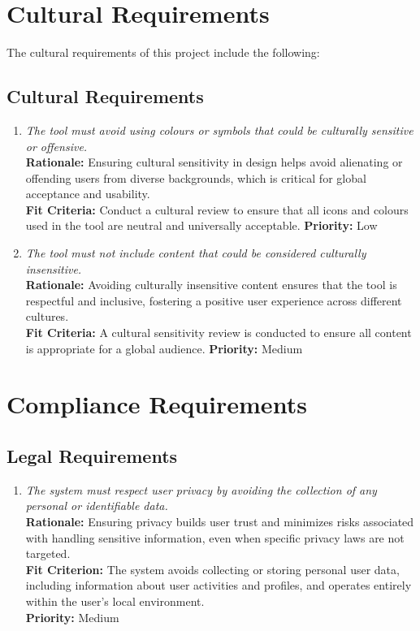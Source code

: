 \documentclass[12pt]{article}
\begin{document}
\section{Cultural Requirements}
The cultural requirements of this project include the following:
\subsection{Cultural Requirements}
\begin{enumerate}[label=CULT \arabic*., wide=0pt, leftmargin=*]
  \item \emph{The tool must avoid using colours or symbols that could
    be culturally sensitive or offensive.}\\
    {\bf Rationale:} Ensuring cultural sensitivity in design helps
    avoid alienating or offending users from diverse backgrounds,
    which is critical for global acceptance and usability.\\
    {\bf Fit Criteria:} Conduct a cultural review to ensure that all
    icons and colours used in the tool are neutral and universally acceptable.
    {\bf Priority:} Low


  \item \emph{The tool must not include content that could be
    considered culturally insensitive.}\\
    {\bf Rationale:} Avoiding culturally insensitive content ensures
    that the tool is respectful and inclusive, fostering a positive
    user experience across different cultures.\\
    {\bf Fit Criteria:} A cultural sensitivity review is conducted to
    ensure all content is appropriate for a global audience.
    {\bf Priority:} Medium

\end{enumerate}

\section{Compliance Requirements}
\subsection{Legal Requirements}
\begin{enumerate}[label=CR-LR \arabic*., wide=0pt, leftmargin=*]
  \item \emph{The system must respect user privacy by avoiding the
    collection of any personal or identifiable data.}\\[2mm]
    {\bf Rationale:} Ensuring privacy builds user trust and minimizes
    risks associated with handling sensitive information, even when
    specific privacy laws are not targeted.\\
    {\bf Fit Criterion:} The system avoids collecting or storing
    personal user data, including information about user activities
    and profiles, and operates entirely within the user’s local environment.\\
    {\bf Priority:} Medium
\end{enumerate}
\end{document}
